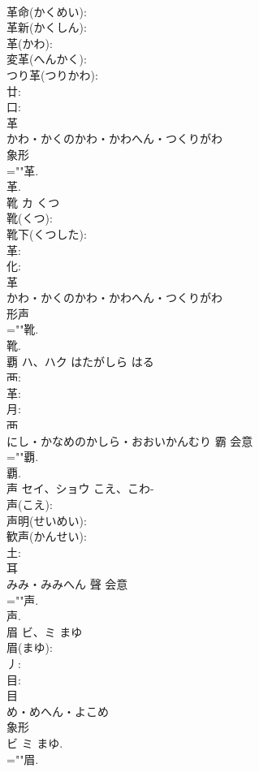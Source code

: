 \documentclass[8pt]{extreport}
\begin{document}
\begin{CJK}{UTF8}{min}
\\	革命(かくめい): 
\\	革新(かくしん): 
\\	革(かわ): 
\\	変革(へんかく): 
\\	つり革(つりかわ): 
\\	廿: 
\\	口: 
\\	革	
\\	かわ・かくのかわ・かわへん・つくりがわ	
\\	象形 
\\	=""革.
\\	革.
\\	靴	カ	くつ		
\\	靴(くつ): 
\\	靴下(くつした): 
\\	革: 
\\	化: 
\\	革	
\\	かわ・かくのかわ・かわへん・つくりがわ	
\\	形声 
\\	=""靴.
\\	靴.
\\	覇	ハ、ハク	はたがしら	はる	
\\	襾: 
\\	革: 
\\	月: 
\\	襾	
\\	にし・かなめのかしら・おおいかんむり	霸	会意 
\\	=""覇.
\\	覇.
\\	声	セイ、ショウ	こえ、こわ-		
\\	声(こえ): 
\\	声明(せいめい): 
\\	歓声(かんせい): 
\\	土: 
\\	耳	
\\	みみ・みみへん	聲	会意 
\\	=""声.
\\	声.
\\	眉	ビ、ミ	まゆ		
\\	眉(まゆ): 
\\	丿: 
\\	目: 
\\	目	
\\	め・めへん・よこめ	
\\	象形 
\\	ビ ミ まゆ.	
\\	=""眉.

\end{CJK}
\end{document}
